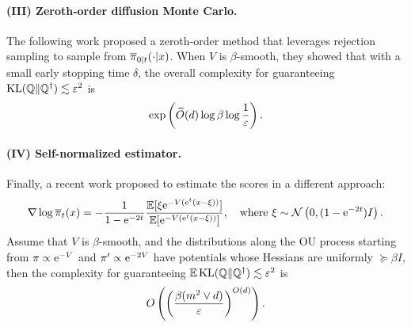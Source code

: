 \paragraph{(III) Zeroth-order diffusion Monte Carlo.} The following work \cite{he2024zeroth} proposed a zeroth-order method that leverages rejection sampling to sample from $\overline{\pi}_{0|t}(\cdot|x)$. When $V$ is $\beta$-smooth, they showed that with a small early stopping time $\delta$, the overall complexity for guaranteeing $\operatorname{KL}(\mathbb{Q}\|\mathbb{Q}^\dagger)\lesssim\varepsilon^2$ is $$\exp\left(\widetilde{O}(d)\log\beta\log\frac{1}{\varepsilon}\right).$$

\paragraph{(IV) Self-normalized estimator.} Finally, a recent work \cite{vacher2025polynomial} proposed to estimate the scores in a different approach:
$$\nabla\log\overline{\pi}_t(x)=-\frac{1}{1-\mathrm{e}^{-2t}}\frac{\operatorname{\mathbb{E}}[\xi\mathrm{e}^{-V(\mathrm{e}^t(x-\xi))}]}{\operatorname{\mathbb{E}}[\mathrm{e}^{-V(\mathrm{e}^t(x-\xi))}]},\quad\text{where}~\xi\sim\operatorname{\mathcal{N}}\left(0,(1-\mathrm{e}^{-2t})I\right).$$
Assume that $V$ is $\beta$-smooth, and the distributions along the OU process starting from $\pi\propto\mathrm{e}^{-V}$ and $\pi'\propto\mathrm{e}^{-2V}$ have potentials whose Hessians are uniformly $\succeq\beta I$, then the complexity for guaranteeing $\operatorname{\mathbb{E}}\operatorname{KL}(\mathbb{Q}\|\mathbb{Q}^\dagger)\lesssim\varepsilon^2$ is
$$O\left(\left(\frac{\beta(m^2\vee d)}{\varepsilon}\right)^{O(d)}\right).$$